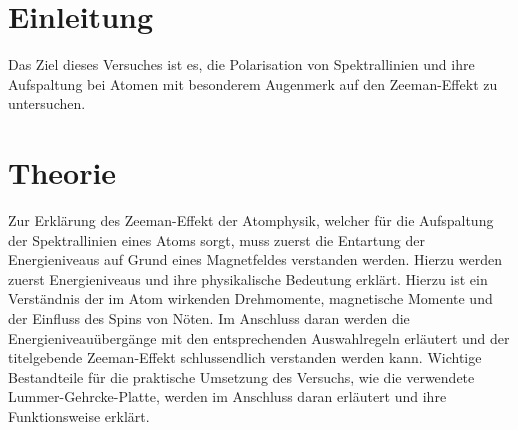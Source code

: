 \section{Einleitung}
Das Ziel dieses Versuches ist es, die Polarisation von Spektrallinien und ihre Aufspaltung bei Atomen mit besonderem Augenmerk auf den Zeeman-Effekt zu untersuchen.

\section{Theorie}
Zur Erklärung des Zeeman-Effekt der Atomphysik, welcher für die Aufspaltung der Spektrallinien eines Atoms sorgt, muss zuerst die Entartung der Energieniveaus auf Grund eines Magnetfeldes verstanden werden. Hierzu werden zuerst Energieniveaus und ihre physikalische Bedeutung erklärt. Hierzu ist ein Verständnis der im Atom wirkenden Drehmomente, magnetische Momente und der Einfluss des Spins von Nöten. Im Anschluss daran werden die Energieniveauübergänge mit den entsprechenden Auswahlregeln erläutert und der titelgebende Zeeman-Effekt schlussendlich verstanden werden kann. 
Wichtige Bestandteile für die praktische Umsetzung des Versuchs, wie die verwendete Lummer-Gehrcke-Platte, werden im Anschluss daran erläutert und ihre Funktionsweise erklärt.


